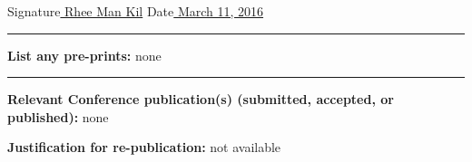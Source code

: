 \documentclass[times,twocolumn,final,authoryear]{elsarticle}
\begin{document}
\begin{table}[!th]
\begin{minipage}{.9\textwidth}
Signature\underline{ Rhee Man Kil\hphantom{\hspace*{5cm}}} Date\underline{ March 11, 2016\hphantom{\hspace*{1.7cm}}} 
\vskip1pc

\rule{\textwidth}{2pt}
\vskip1pc

{\bf List any pre-prints:} none
\vskip5pc


\rule{\textwidth}{2pt}
\vskip1pc

{\bf Relevant Conference publication(s) (submitted, accepted, or
published):} none
\vskip5pc



{\bf Justification for re-publication:} not available

\end{minipage}
\end{table}

\clearpage
\thispagestyle{empty}
\ifpreprint
  \vspace*{-1pc}
\fi
\end{document}
